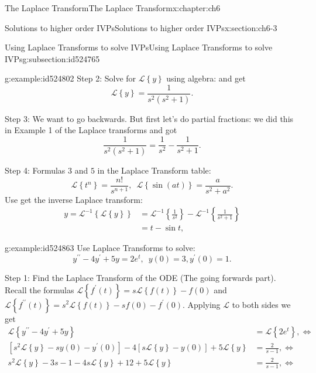 \documentclass[oneside,10pt,]{book}
\numberwithin{equation}{section}
\numberwithin{equation}{section}
\newcommand{\amp}{&}
\begin{document}
\begin{chapterptx}{The Laplace Transform}{}{The Laplace Transform}{}{}{x:chapter:ch6}
\begin{sectionptx}{Solutions to higher order IVPs}{}{Solutions to higher order IVPs}{}{}{x:section:ch6-3}
\begin{subsectionptx}{Using Laplace Transforms to solve IVPs}{}{Using Laplace Transforms to solve IVPs}{}{}{g:subsection:id524765}
\begin{example}{}{g:example:id524802}
Step 2: Solve for \(\mathcal{L}\left\{ y\right\} \) using algebra: and get%
\begin{equation*}
\mathcal{L}\left\{ y\right\} =\frac{1}{s^{2}\left(s^{2}+1\right)}.
\end{equation*}
%
\par
Step 3: We want to go backwards. But first let's do partial fractions: we did this in Example 1 of the Laplace transforms and got%
\begin{equation*}
\frac{1}{s^{2}\left(s^{2}+1\right)}=\frac{1}{s^{2}}-\frac{1}{s^{2}+1}.
\end{equation*}
%
\par
Step 4: Formulas \(3\) and \(5\) in the Laplace Transform table:%
\begin{equation*}
\mathcal{L}\left\{ t^{n}\right\} =\frac{n!}{s^{n+1}},\,\,\,\mathcal{L}\left\{ \sin(at)\right\} =\frac{a}{s^{2}+a^{2}}.
\end{equation*}
Use get the inverse Laplace transform:%
\begin{align*}
y=\mathcal{L}^{-1}\left\{ \mathcal{L}\left\{ y\right\} \right\}  \amp =\mathcal{L}^{-1}\left\{ \frac{1}{s^{2}}\right\} -\mathcal{L}^{-1}\left\{ \frac{1}{s^{2}+1}\right\} \\
\amp =t-\sin t,
\end{align*}
%
\end{example}
\begin{example}{}{g:example:id524863}%
Use Laplace Transforms to solve:%
\begin{equation*}
y^{\prime\prime}-4y^{\prime}+5y=2e^{t},\,\,\,y(0)=3,y^{\prime}(0)=1.
\end{equation*}
%
\par
Step 1: Find the Laplace Transform of the ODE (The going forwards part). Recall the formulas \(\mathcal{L}\left\{ f^{\prime}(t)\right\} =s\mathcal{L}\left\{ f(t)\right\} -f(0)\) and \(\mathcal{L}\left\{ f^{\prime\prime}(t)\right\} =s^{2}\mathcal{L}\left\{ f(t)\right\} -sf(0)-f^{\prime}(0)\). Applying \(\mathcal{L}\) to both sides we get%
\begin{align*}
\mathcal{L}\left\{ y^{\prime\prime}-4y^{\prime}+5y\right\}  \amp =\mathcal{L}\left\{ 2e^{t}\right\} ,\iff\\
\left[s^{2}\mathcal{L}\left\{ y\right\} -sy(0)-y^{\prime}(0)\right]-4\left[s\mathcal{L}\left\{ y\right\} -y(0)\right]+5\mathcal{L}\left\{ y\right\}  \amp =\frac{2}{s-1},\iff\\
s^{2}\mathcal{L}\left\{ y\right\} -3s-1-4s\mathcal{L}\left\{ y\right\} +12+5\mathcal{L}\left\{ y\right\}  \amp =\frac{2}{s-1},\iff\\

\end{align*}
\end{example}
\end{subsectionptx}
\end{sectionptx}
\end{chapterptx}
\end{document}
